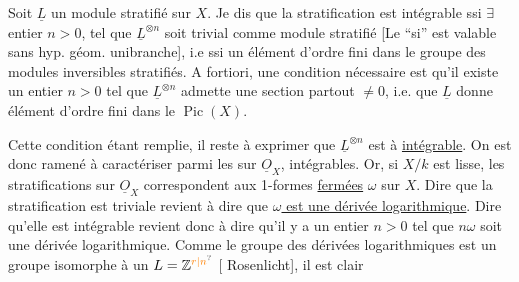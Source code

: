 Soit $\underline L$ un module  stratifié sur $X$. Je dis que la stratification est intégrable ssi $\exists$ entier $n>0$,  tel que $\underline L^{\otimes n}$ soit trivial comme module stratifié [Le ``si'' est valable sans hyp. géom. unibranche], i.e ssi   un élément d'ordre fini  dans le groupe des modules inversibles stratifiés. A fortiori, une  condition nécessaire est qu'il existe un entier $n>0$  tel que $\underline L^{\otimes n}$ admette une section partout $\ne 0$, i.e. que $\underline L$ donne élément d'ordre fini  dans le $\operatorname{Pic}(X)$.

Cette condition étant remplie, il reste à exprimer que $\underline L^{\otimes n}$ est à   \uline{intégrable}. On est donc ramené à caractériser  parmi les   sur $\underline O_X$,   intégrables. Or, si $X/k$ est lisse,   les stratifications sur $\underline O_X$ correspondent aux  1-formes \uline{fermées} $\omega$ sur $X$.  Dire que la stratification  est triviale  revient à dire que \uline{$\omega$ est une dérivée logarithmique}. Dire qu'elle est intégrable revient donc à dire qu'il y a un entier $n>0$ tel que $n\omega$ soit une dérivée logarithmique. Comme le groupe des dérivées logarithmiques est un groupe isomorphe à un $L=\mathbb Z^{\unsure{r|n}}$ [ Rosenlicht], il est clair
